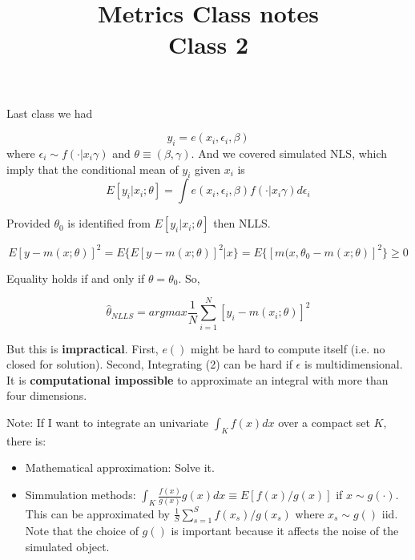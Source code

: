 \documentclass[12pt]{article}
\title{\Large{\textbf{Metrics Class notes}} \\
Class 2}
\begin{document}
\maketitle

Last class we had

\begin{equation}

	y_i = e(x_i, \epsilon_i, \beta)
\end{equation}
	where $\epsilon_i \sim f(\cdot | x_i \gamma )$ and $\theta \equiv (\beta, \gamma)$. And we covered simulated NLS, which imply that the conditional mean of $y_i$ given $x_i$ is
	\begin{equation}
		E[y_i | x_i; \theta] = \int e(x_i, \epsilon_i, \beta) f(\cdot | x_i \gamma ) d \epsilon_i

	\end{equation}

	Provided $\theta_0$ is identified from $E[y_i | x_i; \theta]$ then NLLS.

	\begin{equation}
		E[y - m(x;\theta)]^2 = E \{ E[y - m(x;\theta)]^2 | x \} = E \{ [m(x,\theta_0 - m(x; \theta)]^2 \} \geq 0
	\end{equation}

	Equality holds if and only if $\theta=\theta_0$. So, 

	\begin{equation}
		\hat{\theta}_{NLLS} = argmax \frac{1}{N} \sum^N_{i=1} [y_i - m(x_i; \theta)]^2
	\end{equation}

	But this is \textbf{impractical}. First, $e()$ might be hard to compute itself (i.e. no closed for solution). Second, Integrating (2) can be hard if $\epsilon$ is multidimensional. It is \textbf{computational impossible} to approximate an integral with more than four dimensions.

	Note: If I want to integrate an univariate $\int_K f(x) dx$ over a compact set $K$, there is:
	\begin{itemize}
		\item Mathematical approximation: Solve it.
		\item Simmulation methods: $\int_K \frac{f(x)}{g(x)} g(x) dx \equiv E[f(x)/g(x)]$ if $x \sim g(\cdot)$. This can be approximated by $\frac{1}{S} \sum^S_{s=1} f(x_s)/g(x_s)$ where $x_s \sim g()$ iid. Note that the choice of $g()$ is important because it affects the noise of the simulated object.
	\end{itemize}
\end{document}

